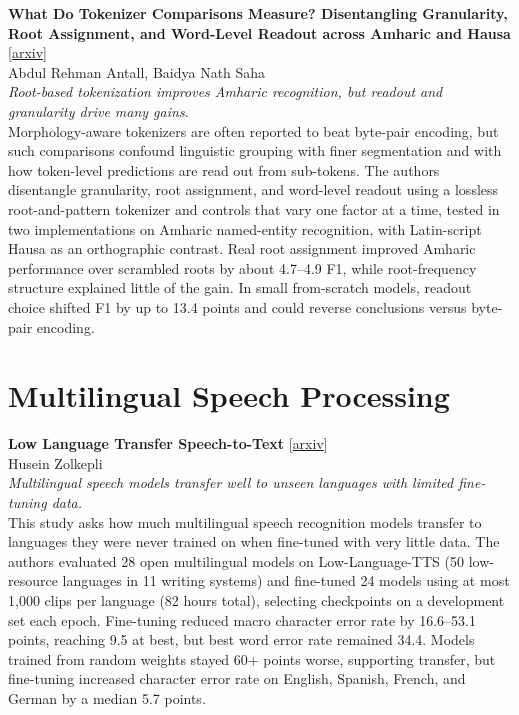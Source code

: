 \documentclass[12pt,letterpaper]{article}
\begin{document}
\medskip
\begin{minipage}{\linewidth}
{\small\textbf{What Do Tokenizer Comparisons Measure? Disentangling Granularity, Root Assignment, and Word-Level Readout across Amharic and Hausa}} {\scriptsize[\href{https://arxiv.org/abs/2611.14818}{arxiv}]}\\
{\scriptsize Abdul Rehman Antall, Baidya Nath Saha}\\
{\footnotesize\textit{Root-based tokenization improves Amharic recognition, but readout and granularity drive many gains.}}\\[2pt]
{\footnotesize Morphology-aware tokenizers are often reported to beat byte-pair encoding, but such comparisons confound linguistic grouping with finer segmentation and with how token-level predictions are read out from sub-tokens. The authors disentangle granularity, root assignment, and word-level readout using a lossless root-and-pattern tokenizer and controls that vary one factor at a time, tested in two implementations on Amharic named-entity recognition, with Latin-script Hausa as an orthographic contrast. Real root assignment improved Amharic performance over scrambled roots by about 4.7--4.9 F1, while root-frequency structure explained little of the gain. In small from-scratch models, readout choice shifted F1 by up to 13.4 points and could reverse conclusions versus byte-pair encoding.}
\end{minipage}

\medskip
\section*{Multilingual Speech Processing}
\begin{minipage}{\linewidth}
{\small\textbf{Low Language Transfer Speech-to-Text}} {\scriptsize[\href{https://arxiv.org/abs/2611.16260}{arxiv}]}\\
{\scriptsize Husein Zolkepli}\\
{\footnotesize\textit{Multilingual speech models transfer well to unseen languages with limited fine-tuning data.}}\\[2pt]
{\footnotesize This study asks how much multilingual speech recognition models transfer to languages they were never trained on when fine-tuned with very little data. The authors evaluated 28 open multilingual models on Low-Language-TTS (50 low-resource languages in 11 writing systems) and fine-tuned 24 models using at most 1,000 clips per language (82 hours total), selecting checkpoints on a development set each epoch. Fine-tuning reduced macro character error rate by 16.6--53.1 points, reaching 9.5 at best, but best word error rate remained 34.4. Models trained from random weights stayed 60+ points worse, supporting transfer, but fine-tuning increased character error rate on English, Spanish, French, and German by a median 5.7 points.}
\end{minipage}
\end{document}
